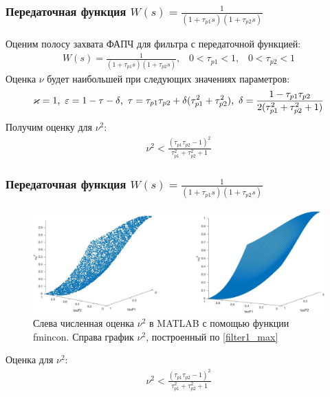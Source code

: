 \documentclass{beamer}
\begin{document}
\begin{frame}
\frametitle{Передаточная функция $W(s) = \frac{1}{(1+\tau_{p1}s)(1+\tau_{p2}s)}$}
Оценим полосу захвата ФАПЧ для фильтра с передаточной функцией:
 \begin{equation}\label{filter1}
 \begin{aligned}
W(s) = \frac{1}{(1+\tau_{p1}s)(1+\tau_{p2}s)}\text{,} \quad0 < \tau_{p1} < 1 \text{,} \quad 0 < \tau_{p2} <1
 \end{aligned}
\end{equation}
Оценка $\nu$ будет наибольшей при следующих значениях параметров:
 \begin{equation*}
 \begin{aligned}
\varkappa = 1 \text{,} \enskip  \varepsilon = 1 - \tau - \delta \text{,} \enskip \tau = \tau_{p1}\tau_{p2} + \delta(\tau_{p1}^2+\tau_{p2}^2) \text{,} \enskip \delta = \frac{1-\tau_{p1}\tau_{p2}}{2(\tau_{p1}^2+\tau_{p2}^2 + 1)}
 \end{aligned}
\end{equation*}
Получим оценку для $\nu^2$:
\begin{equation}
 \begin{aligned}
\nu^2 < \frac{(\tau_{p1}\tau_{p2} - 1)^2}{\tau_{p1}^2 + \tau_{p2}^2 + 1}
 \end{aligned}
\end{equation}
\end{frame}


\begin{frame}
\frametitle{Передаточная функция $W(s) = \frac{1}{(1+\tau_{p1}s)(1+\tau_{p2}s)}$}
  \begin{figure}[H] 
  \includegraphics[width=\textwidth]{images/agregated.eps}
\caption{Слева численная оценка $\nu^2$ в MATLAB с помощью функции fmincon. Справа график $\nu^2$, построенный по \eqref{filter1_max}}
\end{figure}\vspace{-3mm}
Оценка для $\nu^2$:
\begin{equation}\label{filter1_max}
 \begin{aligned}
\nu^2 < \frac{(\tau_{p1}\tau_{p2} - 1)^2}{\tau_{p1}^2 + \tau_{p2}^2 + 1}
 \end{aligned}
\end{equation}
\end{frame}
\end{document}
